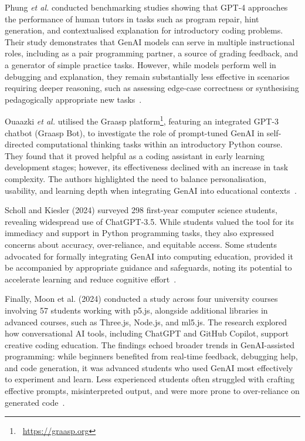 Phung \textit{et al.} conducted benchmarking studies showing that GPT-4 approaches the performance of human tutors in tasks such as program repair, hint generation, and contextualised explanation for introductory coding problems. Their study demonstrates that GenAI models can serve in multiple instructional roles, including as a pair programming partner, a source of grading feedback, and a generator of simple practice tasks. However, while models perform well in debugging and explanation, they remain substantially less effective in scenarios requiring deeper reasoning, such as assessing edge-case correctness or synthesising pedagogically appropriate new tasks~\cite{phung_generative_2023}. 

Ouaazki \textit{et al.} utilised the Graasp platform\footnote{~\url{https://graasp.org}}, featuring an integrated GPT-3 chatbot (Graasp Bot), to investigate the role of prompt-tuned GenAI in self-directed computational thinking tasks within an introductory Python course. They found that it proved helpful as a coding assistant in early learning development stages; however, its effectiveness declined with an increase in task complexity. The authors highlighted the need to balance personalisation, usability, and learning depth when integrating GenAI into educational contexts~\cite{ouaazki_generative_2024}.

Scholl and Kiesler (2024) surveyed 298 first-year computer science students, revealing widespread use of ChatGPT-3.5. While students valued the tool for its immediacy and support in Python programming tasks, they also expressed concerns about accuracy, over-reliance, and equitable access. Some students advocated for formally integrating GenAI into computing education, provided it be accompanied by appropriate guidance and safeguards, noting its potential to accelerate learning and reduce cognitive effort~\cite{scholl_how_2024}.

Finally, Moon et al. (2024) conducted a study across four university courses involving 57 students working with p5.js, alongside additional libraries in advanced courses, such as Three.js, Node.js, and ml5.js. The research explored how conversational AI tools, including ChatGPT and GitHub Copilot, support creative coding education. The findings echoed broader trends in GenAI-assisted programming: while beginners benefited from real-time feedback, debugging help, and code generation, it was advanced students who used GenAI most effectively to experiment and learn. Less experienced students often struggled with crafting effective prompts, misinterpreted output, and were more prone to over-reliance on generated code~\cite{moon_teaching_2024}.

